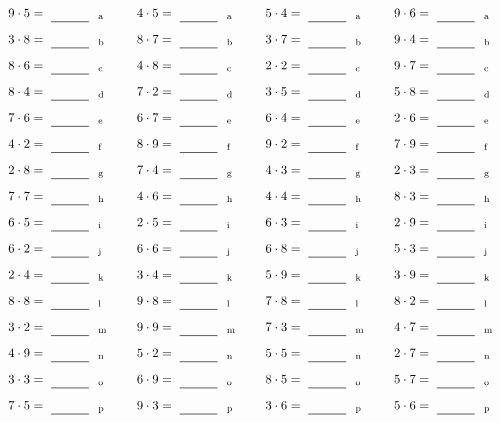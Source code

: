 \documentclass
[
  draft    = true,
  fontsize = 11pt,
  parskip  = half-
]
{scrartcl}
\begin{document}
\par\vfill\par
\begin{align*}
    \pline{9\cdot5}&=\rline{a}
  & \pline{4\cdot5}&=\rline{a}
  & \pline{5\cdot4}&=\rline{a}
  & \pline{9\cdot6}&=\rline{a} \\[1ex]
    \pline{3\cdot8}&=\rline{b}
  & \pline{8\cdot7}&=\rline{b}
  & \pline{3\cdot7}&=\rline{b}
  & \pline{9\cdot4}&=\rline{b} \\[1ex]
    \pline{8\cdot6}&=\rline{c}
  & \pline{4\cdot8}&=\rline{c}
  & \pline{2\cdot2}&=\rline{c}
  & \pline{9\cdot7}&=\rline{c} \\[1ex]
    \pline{8\cdot4}&=\rline{d}
  & \pline{7\cdot2}&=\rline{d}
  & \pline{3\cdot5}&=\rline{d}
  & \pline{5\cdot8}&=\rline{d} \\[1ex]
    \pline{7\cdot6}&=\rline{e}
  & \pline{6\cdot7}&=\rline{e}
  & \pline{6\cdot4}&=\rline{e}
  & \pline{2\cdot6}&=\rline{e} \\[1ex]
    \pline{4\cdot2}&=\rline{f}
  & \pline{8\cdot9}&=\rline{f}
  & \pline{9\cdot2}&=\rline{f}
  & \pline{7\cdot9}&=\rline{f} \\[1ex]
    \pline{2\cdot8}&=\rline{g}
  & \pline{7\cdot4}&=\rline{g}
  & \pline{4\cdot3}&=\rline{g}
  & \pline{2\cdot3}&=\rline{g} \\[1ex]
    \pline{7\cdot7}&=\rline{h}
  & \pline{4\cdot6}&=\rline{h}
  & \pline{4\cdot4}&=\rline{h}
  & \pline{8\cdot3}&=\rline{h} \\[1ex]
    \pline{6\cdot5}&=\rline{i}
  & \pline{2\cdot5}&=\rline{i}
  & \pline{6\cdot3}&=\rline{i}
  & \pline{2\cdot9}&=\rline{i} \\[1ex]
    \pline{6\cdot2}&=\rline{j}
  & \pline{6\cdot6}&=\rline{j}
  & \pline{6\cdot8}&=\rline{j}
  & \pline{5\cdot3}&=\rline{j} \\[1ex]
    \pline{2\cdot4}&=\rline{k}
  & \pline{3\cdot4}&=\rline{k}
  & \pline{5\cdot9}&=\rline{k}
  & \pline{3\cdot9}&=\rline{k} \\[1ex]
    \pline{8\cdot8}&=\rline{l}
  & \pline{9\cdot8}&=\rline{l}
  & \pline{7\cdot8}&=\rline{l}
  & \pline{8\cdot2}&=\rline{l} \\[1ex]
    \pline{3\cdot2}&=\rline{m}
  & \pline{9\cdot9}&=\rline{m}
  & \pline{7\cdot3}&=\rline{m}
  & \pline{4\cdot7}&=\rline{m} \\[1ex]
    \pline{4\cdot9}&=\rline{n}
  & \pline{5\cdot2}&=\rline{n}
  & \pline{5\cdot5}&=\rline{n}
  & \pline{2\cdot7}&=\rline{n} \\[1ex]
    \pline{3\cdot3}&=\rline{o}
  & \pline{6\cdot9}&=\rline{o}
  & \pline{8\cdot5}&=\rline{o}
  & \pline{5\cdot7}&=\rline{o} \\[1ex]
    \pline{7\cdot5}&=\rline{p}
  & \pline{9\cdot3}&=\rline{p}
  & \pline{3\cdot6}&=\rline{p}
  & \pline{5\cdot6}&=\rline{p}
\end{align*}
\end{document}
